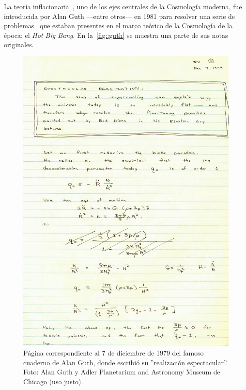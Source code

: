 La teoría inflacionaria~\cite{albrecht1982cosmology,guth1981inflationary,linde1982new}, uno de los ejes centrales de la Cosmología moderna, fue introducida por Alan Guth ---entre otros--- en 1981 para resolver una serie de problemas~\cite{peebles1993principles} que estaban presentes en el marco teórico de la Cosmología de la época: el \textit{Hot Big Bang}. En la~\autoref{fig::guth} se muestra una parte de sus notas originales.
\begin{figure}[t]
    \centering
    \includegraphics[scale=.99]{img/AlanGuth.jpg}
    \caption[Cuaderno con la idea original de Guth]{Página correspondiente al 7 de diciembre de 1979 del famoso cuaderno de Alan Guth, donde escribió su ''realización espectacular''. Foto: Alan Guth y Adler Planetarium and Astronomy Museum de Chicago (uso justo).}
    \label{fig::guth}
\end{figure}

